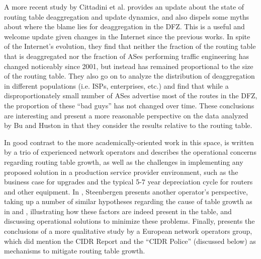 A more recent study by Cittadini et al. \cite{Cittadini:2010pi} provides an
update about the state of routing table deaggregation and update dynamics, and
also dispels some myths about where the blame lies for deaggregation in the
DFZ. This is a useful and welcome update given changes in the Internet since
the previous works. In spite of the Internet's evolution, they find that
neither the fraction of the routing table that is deaggregated nor the fraction
of ASes performing traffic engineering has changed noticeably since 2001, but
instead has remained proportional to the size of the routing table. They also
go on to analyze the distribution of deaggregation in different populations
(i.e. ISPs, enterprises, etc.) and find that while a disproportionately small
number of ASes advertise most of the routes in the DFZ, the proportion of these
``bad guys'' has not changed over time. These conclusions are interesting and
present a more reasonable perspective on the data analyzed by Bu and Huston in
that they consider the results relative to the routing table.

In good contrast to the more academically-oriented work in this space,
\cite{Zhao:2001ly} is written by a trio of experienced network operators and
describes the operational concerns regarding routing table growth, as well as
the challenges in implementing any proposed solution in a production service
provider environment, such as the business case for upgrades and the typical
5-7 year depreciation cycle for routers and other equipment. In
\cite{Steenbergen:2010nx}, Steenbergen presents another operator's perspective,
taking up a number of similar hypotheses regarding the cause of table growth as
in \cite{Bu:2004fk} and \cite{Cittadini:2010pi}, illustrating how these factors
are indeed present in the table, and discussing operational solutions to
minimize these problems. Finally, \cite{Smith:2006vn} presents the conclusions
of a more qualitative study by a European network operators group, which did
mention the CIDR Report and the ``CIDR Police'' (discussed below) as mechanisms
to mitigate routing table growth.


